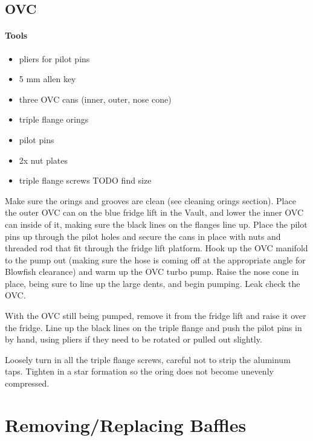 \subsection{OVC}

\paragraph{Tools}
\begin{itemize}
 \item pliers for pilot pins
\item 5 mm allen key
\item three OVC cans (inner, outer, nose cone)
\item triple flange orings
\item pilot pins
\item 2x nut plates
\item triple flange screws TODO find size
\end{itemize}

Make sure the orings and grooves are clean (see cleaning orings section).  Place the outer OVC can on the blue fridge lift in the Vault, and lower the inner OVC can inside of it, making sure the black lines on the flanges line up.  Place the pilot pins up through the pilot holes and secure the cans in place with nuts and threaded rod that fit through the fridge lift platform.  Hook up the OVC manifold to the pump out (making sure the hose is coming off at the appropriate angle for Blowfish clearance) and warm up the OVC turbo pump.  Raise the nose cone in place, being sure to line up the large dents, and begin pumping.  Leak check the OVC.


With the OVC still being pumped, remove it from the fridge lift and raise it over the fridge.  Line up the black lines on the triple flange and push the pilot pins in by hand, using pliers if they need to be rotated or pulled out slightly.


Loosely turn in all the triple flange screws, careful not to strip the aluminum taps.  Tighten in a star formation so the oring does not become unevenly compressed.

\section{Removing/Replacing \het{} Baffles}